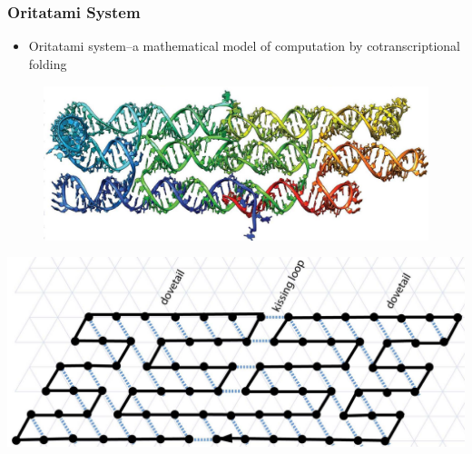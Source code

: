 \documentclass[dvipdfmx,10pt]{beamer}
\begin{document}
\begin{frame}\frametitle{Oritatami System}
\begin{itemize}
\item Oritatami system--a mathematical model of computation by cotranscriptional folding
\end{itemize}
\begin{figure}
\centering
\includegraphics[width=0.6\linewidth]{rna_tile.pdf}
\end{figure}
\begin{minipage}{0.25\linewidth}
\end{minipage}
\begin{minipage}{0.6\linewidth}
\includegraphics[width=\linewidth]{origami_oritatami.pdf}
\end{minipage}


\end{frame}


\end{document}
